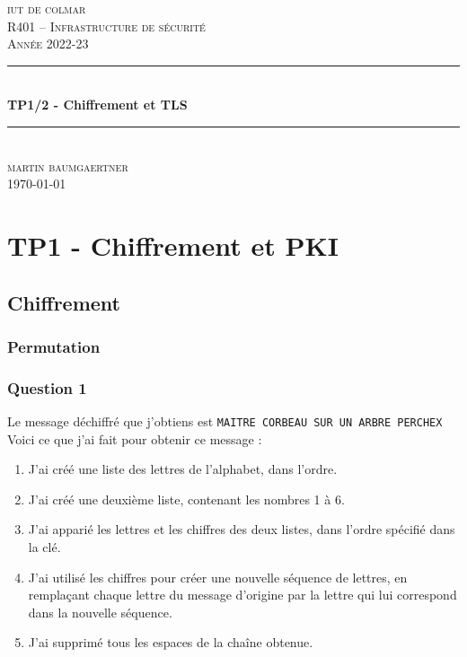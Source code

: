\documentclass[12pt, a4paper]{article}
\begin{document}
\begin{titlepage}
	\newcommand{\HRule}{\rule{\linewidth}{0.5mm}} 
	\center 
	\textsc{\LARGE iut de colmar}\\[6.5cm] 
	\textsc{\Large R401 -- Infrastructure de sécurité}\\[0.5cm] 
	\textsc{\large Année 2022-23}\\[0.5cm]
	\HRule\\[0.75cm]
	{\huge\bfseries TP1/2 - Chiffrement et TLS}\\[0.4cm]
	\HRule\\[1.5cm]
	\textsc{\large martin baumgaertner}\\[6cm] 

	\vfill\vfill\vfill
	{\large\today} 
	\vfill
\end{titlepage}
\newpage
\tableofcontents
\newpage
\section{TP1 - Chiffrement et PKI}
\subsection{Chiffrement}
    \subsubsection{Permutation}
    \subsubsection*{Question 1}
    Le message déchiffré que j'obtiens est \texttt{MAITRE CORBEAU SUR UN ARBRE PERCHEX}
    Voici ce que j'ai fait pour obtenir ce message :
    \begin{enumerate}
        \item J'ai créé une liste des lettres de l'alphabet, dans l'ordre.
        \item J'ai créé une deuxième liste, contenant les nombres 1 à 6.
        \item J'ai apparié les lettres et les chiffres des deux listes, dans l'ordre spécifié dans la clé.
        \item J'ai utilisé les chiffres pour créer une nouvelle séquence de lettres, en remplaçant chaque lettre du message d'origine par la lettre qui lui correspond dans la nouvelle séquence.
        \item J'ai supprimé tous les espaces de la chaîne obtenue.
    \end{enumerate}
\end{document}
